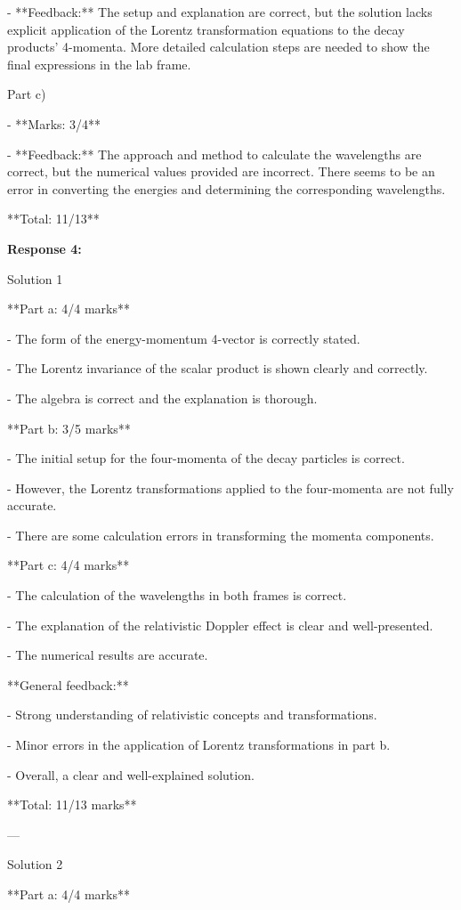 \documentclass[a4paper,11pt]{article}
\begin{document}
- **Feedback:** The setup and explanation are correct, but the solution lacks explicit application of the Lorentz transformation equations to the decay products' 4-momenta. More detailed calculation steps are needed to show the final expressions in the lab frame.

Part c)

- **Marks: 3/4**

- **Feedback:** The approach and method to calculate the wavelengths are correct, but the numerical values provided are incorrect. There seems to be an error in converting the energies and determining the corresponding wavelengths.

**Total: 11/13**

\bigskip
\textbf{Response 4:}

Solution 1

**Part a: 4/4 marks**

- The form of the energy-momentum 4-vector is correctly stated.

- The Lorentz invariance of the scalar product is shown clearly and correctly.

- The algebra is correct and the explanation is thorough.

**Part b: 3/5 marks**

- The initial setup for the four-momenta of the decay particles is correct.

- However, the Lorentz transformations applied to the four-momenta are not fully accurate.

- There are some calculation errors in transforming the momenta components.

**Part c: 4/4 marks**

- The calculation of the wavelengths in both frames is correct.

- The explanation of the relativistic Doppler effect is clear and well-presented.

- The numerical results are accurate.

**General feedback:**

- Strong understanding of relativistic concepts and transformations.

- Minor errors in the application of Lorentz transformations in part b.

- Overall, a clear and well-explained solution.

**Total: 11/13 marks**

---

Solution 2

**Part a: 4/4 marks**
\end{document}
